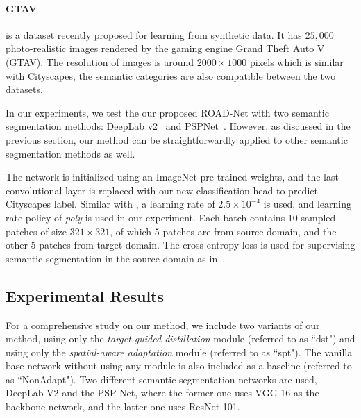 \documentclass[10pt,twocolumn,letterpaper]{article}
\begin{document}
\vspace{-4mm}

\paragraph{GTAV} is a dataset recently proposed for learning from synthetic data. It has $25,000$ photo-realistic images rendered by the gaming engine Grand Theft Auto V (GTAV). The resolution of images is around $2000\times 1000$ pixels which is similar with Cityscapes, the semantic categories are also compatible between the two datasets.

In our experiments, we test the our proposed ROAD-Net with two semantic segmentation methods: DeepLab v2~\cite{chen2016deeplab} and PSPNet~\cite{zhao2016pyramid}. However, as discussed in the previous section, our method can be straightforwardly applied to other semantic segmentation methods as well. 

The network is initialized using an ImageNet pre-trained weights, and the last convolutional layer is replaced with our new classification head to predict Cityscapes label. Similar with \cite{chen2016deeplab}, a learning rate of $2.5\times 10^{-4}$ is used, and learning rate policy of \textit{poly} is used in our experiment. Each batch contains 10 sampled patches of size $321\times 321$, of which $5$ patches are from source domain, and the other $5$ patches from target domain. The cross-entropy loss is used for supervising semantic segmentation in the source domain as in~\cite{long2015fully,chen2016deeplab}. 


\subsection{Experimental Results}
\label{sec:exp_results}
For a comprehensive study on our method, we include two variants of our method, using only the \textit{target guided distillation} module (referred to as ``dst") and using  only the \textit{spatial-aware adaptation} module (referred to as ``spt"). The vanilla base network without using any module is also included as a baseline (referred to as ``NonAdapt"). Two different semantic segmentation networks are used, DeepLab V2 and the PSP Net, where the former one uses VGG-16 as the backbone network, and the latter one uses ResNet-101. 
\end{document}

